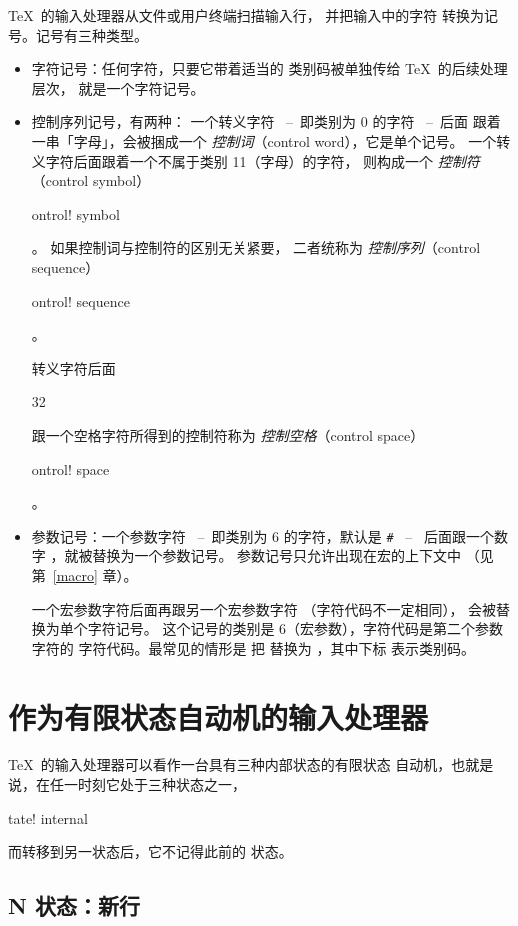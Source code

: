 \documentclass[a4paper]{rapport3}
\makeatletter
\def\ldash{\unskip\ --\nobreak\ \ignorespaces}
\def\rdash{\unskip\nobreak\ --\ \ignorespaces}
\def\term#1\par{\index{#1}}
\def\cstoidx#1\par{\index{#1@\cs{#1}}}
\def\csterm#1\par{\cstoidx #1\par\cs{#1}}
\makeatother
\begin{document}
\TeX\ 的输入处理器从文件或用户终端扫描输入行，
并把输入中的字符
转换为记号。记号有三种类型。
\begin{itemize}\item 字符记号：任何字符，只要它带着适当的
      类别码被单独传给 \TeX\ 的后续处理层次，
      就是一个字符记号。
\item 控制序列记号，有两种：
      一个转义字符
\ldash 即类别为 0 的字符 \rdash 后面
跟着一串「字母」，会被捆成一个
{\em 控制词\/}（control word），它是单个记号。
一个转义字符后面跟着一个不属于类别 11（字母）的字符，
则构成一个
{\em 控制符\/}（control symbol）\term control! symbol\par。
如果控制词与控制符的区别无关紧要，
二者统称为
{\em 控制序列\/}（control sequence）\term control! sequence\par。

转义字符后面
\csterm \char32\par
跟一个空格字符所得到的控制符称为
{\em 控制空格\/}（control space）\term control! space\par。

\item 参数记号：一个参数字符
\ldash 即类别为 6 的字符，默认是 \verb=#= \rdash
后面跟一个数字 ，就被替换为一个参数记号。
参数记号只允许出现在宏的上下文中
（见第~\ref{macro} 章）。

一个宏参数字符后面再跟另一个宏参数字符
（字符代码不一定相同），
会被替换为单个字符记号。
这个记号的类别是 6（宏参数），字符代码是第二个参数字符的
字符代码。最常见的情形是
把 \n{\#\#} 替换为 ，其中下标
表示类别码。

\end{itemize}

\section{作为有限状态自动机的输入处理器}
\label{input:states}

\TeX\ 的输入处理器可以看作一台具有三种内部状态的有限状态
自动机，也就是说，在任一时刻它处于三种状态之一，
\term state! internal\par
而转移到另一状态后，它不记得此前的
\awp
状态。

\subsection{{\italic N} 状态：新行}
\end{document}
